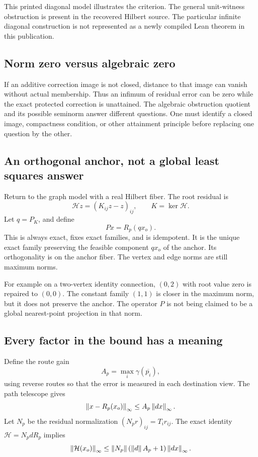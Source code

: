 This printed diagonal model illustrates the criterion. The general unit-witness obstruction is present in the recovered Hilbert source. The particular infinite diagonal construction is not represented as a newly compiled Lean theorem in this publication.


\subsection{Norm zero versus algebraic zero}
If an additive correction image is not closed, distance to that image can vanish without actual membership. Thus an infimum of residual error can be zero while the exact protected correction is unattained. The algebraic obstruction quotient and its possible seminorm answer different questions. One must identify a closed image, compactness condition, or other attainment principle before replacing one question by the other.

\label{sec:holonomyrepair}
\subsection{An orthogonal anchor, not a global least squares answer}
Return to the graph model with a real Hilbert fiber. The root residual is
\[
 \mathcal H z=(K_{ij}z-z)_{ij},\qquad K=\ker\mathcal H.
\]
Let \(q=P_K\), and define
\[
 Px=R_p(qx_o).
\]
This is always exact, fixes exact families, and is idempotent. It is the unique exact family preserving the feasible component \(qx_o\) of the anchor. Its orthogonality is on the anchor fiber. The vertex and edge norms are still maximum norms.

For example on a two-vertex identity connection, \((0,2)\) with root value zero is repaired to \((0,0)\). The constant family \((1,1)\) is closer in the maximum norm, but it does not preserve the anchor. The operator \(P\) is not being claimed to be a global nearest-point projection in that norm.

\subsection{Every factor in the bound has a meaning}
Define the route gain
\[
 A_p=\max_i\gamma(\overline{p_i}),
\]
using reverse routes so that the error is measured in each destination view. The path telescope gives
\[
 \left\lVert x-R_p(x_o)\right\rVert_\infty\le A_p\left\lVert dx\right\rVert_\infty.
\]
Let \(N_p\) be the residual normalization \((N_pr)_{ij}=T_ir_{ij}\). The exact identity \(\mathcal H=N_pdR_p\) implies
\[
 \left\lVert\mathcal H(x_o)\right\rVert_\infty
 \le\left\lVert N_p\right\rVert(\left\lVert d\right\rVert A_p+1)\left\lVert dx\right\rVert_\infty.
\]

